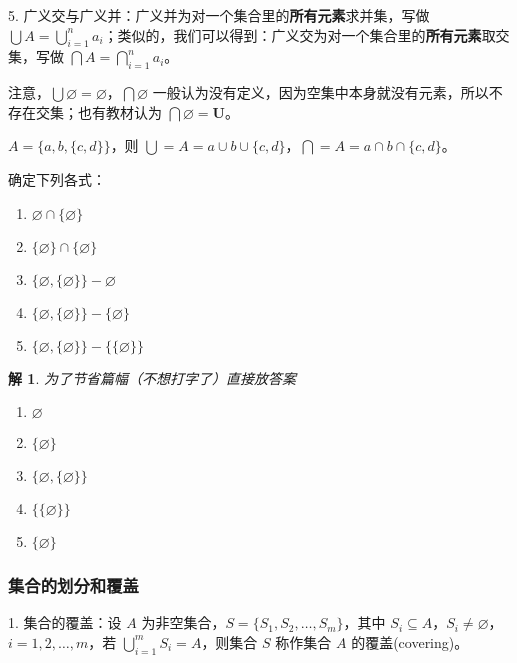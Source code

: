 \documentclass[normal,cyan]{elegantnote}
\newtheorem{solve}{解}
\begin{document}
5. 广义交与广义并：广义并为对一个集合里的\textbf{所有元素}求并集，写做 $\bigcup A = \bigcup\limits_{i = 1}^n a_i$；类似的，我们可以得到：广义交为对一个集合里的\textbf{所有元素}取交集，写做 $\bigcap A = \bigcap \limits_{i = 1}^n a_i$。
\begin{remark}
    注意，$\bigcup \varnothing = \varnothing$，$\bigcap \varnothing$ 一般认为没有定义，因为空集中本身就没有元素，所以不存在交集；也有教材认为 $\bigcap \varnothing = \mathbf{U}$。
\end{remark}
\begin{example}
    $A = \{a,b,\{c,d\}\}$，则 $\bigcup = A = a \cup b \cup \{c, d\}$，$\bigcap = A = a \cap b \cap \{c, d\}$。
\end{example}
\begin{example}
    确定下列各式：
    \begin{enumerate}[1)]
        \item $\varnothing \cap\{\varnothing\}$
        \item $\{\varnothing\} \cap\{\varnothing\}$
        \item $\{\varnothing,\{\varnothing\}\}-\varnothing$
        \item $\{\varnothing,\{\varnothing\}\}-\{\varnothing\}$
        \item $\{\varnothing,\{\varnothing\}\}-\{\{\varnothing\}\}$
    \end{enumerate}
\end{example}
\begin{solve}
    为了节省篇幅（不想打字了）直接放答案
    \begin{enumerate}[1)]
        \item $\varnothing$
        \item $\{\varnothing\}$
        \item $\{\varnothing,\{\varnothing\}\}$
        \item $\{\{\varnothing\}\}$
        \item $\{\varnothing\}$
    \end{enumerate}
\end{solve}
\subsubsection{集合的划分和覆盖}
1. 集合的覆盖：设 $A$ 为非空集合，$S = \{S_1, S_2, \dots, S_m\}$，其中 $S_i \subseteq A$，$S_i \neq \varnothing$，$i = 1, 2, \dots, m$，若 $\bigcup\limits_{i = 1}^m S_i = A$，则集合 $S$ 称作集合 $A$ 的{\color{red}覆盖}(covering)。
\end{document}
